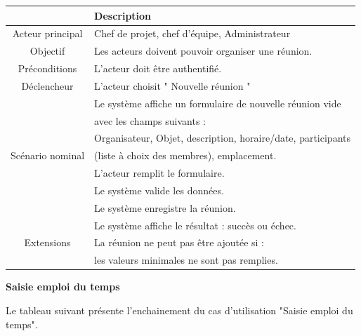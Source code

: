 \begin{center}
\begin{tabular}{|c|l|}
\hline 
&\textbf { Description }\\\hline 
    Acteur principal & Chef de projet, chef d’équipe, Administrateur \\\hline 
    Objectif&Les acteurs doivent pouvoir organiser une réunion.\\\hline
    Préconditions&L’acteur doit être authentifié.  \\\hline 
    Déclencheur&L’acteur choisit " Nouvelle réunion "\\\hline 
    &Le système affiche un formulaire de nouvelle réunion vide       \\
    &avec les champs suivants :    \\
    &Organisateur, Objet, description, horaire/date, participants   \\
    Scénario nominal&(liste à choix des membres), emplacement.     \\
    & L’acteur remplit le formulaire.    \\
    &Le système valide les données. \\&Le système enregistre la réunion.  \\&Le système affiche le résultat : succès ou échec.  \\\hline
    Extensions&  La réunion ne peut pas être ajoutée si : \\&les valeurs minimales ne sont pas remplies.\\\hline
\end{tabular}
\label{desc_org_reunion}
\end{center}
\newpage
\par \textbf{  	Saisie emploi du temps	}
\par Le tableau suivant présente l’enchainement du cas d’utilisation "Saisie emploi du temps".
